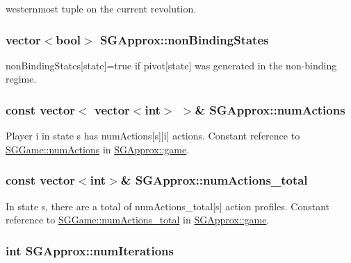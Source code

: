  westernmost tuple on the current revolution. \hypertarget{classSGApprox_ac05d3697e39d0f671858fd9936581820}{
\subsubsection[{non\-Binding\-States}]{\setlength{\rightskip}{0pt plus 5cm}vector$<$bool$>$ S\-G\-Approx\-::non\-Binding\-States\hspace{0.3cm}{\ttfamily [private]}}}\label{classSGApprox_ac05d3697e39d0f671858fd9936581820}
non\-Binding\-States\mbox{[}state\mbox{]}=true if pivot\mbox{[}state\mbox{]} was generated in the non-\/binding regime. \hypertarget{classSGApprox_af3208841348d868b372549dd7508e300}{
\subsubsection[{num\-Actions}]{\setlength{\rightskip}{0pt plus 5cm}const vector$<$ vector$<$int$>$ $>$\& S\-G\-Approx\-::num\-Actions\hspace{0.3cm}{\ttfamily [private]}}}\label{classSGApprox_af3208841348d868b372549dd7508e300}
Player i in state s has num\-Actions\mbox{[}s\mbox{]}\mbox{[}i\mbox{]} actions. Constant reference to \hyperlink{classSGGame_acebe94d195ffb67f92925bcd4c26d1a9}{S\-G\-Game\-::num\-Actions} in \hyperlink{classSGApprox_a0774e3ed0ff009809606a42c9e7ef727}{S\-G\-Approx\-::game}. \hypertarget{classSGApprox_a0b3cacf6c192238c0fa753c4d71358c6}{
\subsubsection[{num\-Actions\-\_\-total}]{\setlength{\rightskip}{0pt plus 5cm}const vector$<$int$>$\& S\-G\-Approx\-::num\-Actions\-\_\-total\hspace{0.3cm}{\ttfamily [private]}}}\label{classSGApprox_a0b3cacf6c192238c0fa753c4d71358c6}
In state s, there are a total of num\-Actions\-\_\-total\mbox{[}s\mbox{]} action profiles. Constant reference to \hyperlink{classSGGame_a3b219a37177b5b8b38737f570e419429}{S\-G\-Game\-::num\-Actions\-\_\-total} in \hyperlink{classSGApprox_a0774e3ed0ff009809606a42c9e7ef727}{S\-G\-Approx\-::game}. \hypertarget{classSGApprox_a7ab53424f5933726a15001ff2885a4a9}{
\subsubsection[{num\-Iterations}]{\setlength{\rightskip}{0pt plus 5cm}int S\-G\-Approx\-::num\-Iterations\hspace{0.3cm}{\ttfamily [private]}}}\label{classSGApprox_a7ab53424f5933726a15001ff2885a4a9}
